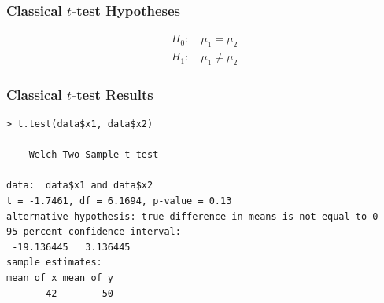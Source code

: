\documentclass{beamer}
\begin{document}
\begin{frame}
\frametitle{Classical $t$-test Hypotheses}

\begin{align}
H_0: \quad \mu_1 = \mu_2 \\
H_1: \quad \mu_1 \neq \mu_2
\end{align}
\end{frame}


\begin{frame}[fragile]
\frametitle{Classical $t$-test Results}
\footnotesize
\begin{verbatim}
> t.test(data$x1, data$x2)

	Welch Two Sample t-test

data:  data$x1 and data$x2
t = -1.7461, df = 6.1694, p-value = 0.13
alternative hypothesis: true difference in means is not equal to 0
95 percent confidence interval:
 -19.136445   3.136445
sample estimates:
mean of x mean of y 
       42        50 
\end{verbatim}

\end{frame}
\end{document}
